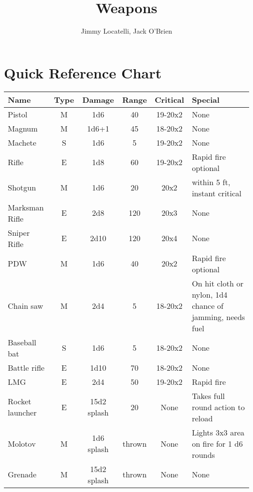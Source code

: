 \documentclass[12pt]{article}
\begin{document}
\title{Weapons}
\author{Jimmy Locatelli, Jack O'Brien}
\maketitle

\section{Quick Reference Chart}

\begin{tabular}{ | l | c | c | c | c | p{5cm} | }
Name & Type & Damage & Range & Critical & Special \\
\hline
Pistol & M & 1d6 & 40 & 19-20x2 & None \\
Magnum & M & 1d6+1 & 45 & 18-20x2 & None \\
Machete & S & 1d6 & 5 & 19-20x2 & None \\
Rifle & E & 1d8 & 60 & 19-20x2 & Rapid fire optional \\
Shotgun & M & 1d6 & 20 & 20x2 & within 5 ft, instant critical \\
Marksman Rifle & E & 2d8 & 120 & 20x3 & None \\
Sniper Rifle & E & 2d10 & 120 & 20x4 & None \\
PDW & M & 1d6 & 40 & 20x2 & Rapid fire optional \\
Chain saw & M & 2d4 & 5 & 18-20x2 & On hit cloth or nylon, 1d4 chance of jamming, needs fuel \\
Baseball bat & S & 1d6 & 5 & 18-20x2 & None \\
Battle rifle & E & 1d10 & 70 & 18-20x2 & None \\
LMG & E & 2d4 & 50 & 19-20x2 & Rapid fire \\
Rocket launcher & E & 15d2 splash & 20 & None & Takes full round action to reload\\
Molotov & M & 1d6 splash & thrown & None & Lights 3x3 area on fire for 1 d6 rounds\\
Grenade & M & 15d2 splash & thrown & None & None\\
\end{tabular}
\end{document}

